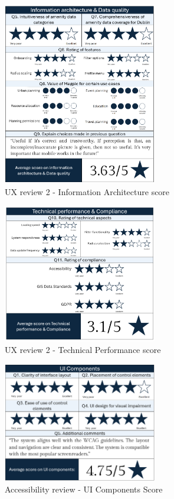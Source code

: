 \begin{figure}[h!]
    \centering
    \includegraphics[width=0.6\textwidth]{images/ux-survey2-data.png}
    \caption{UX review 2 - Information Architecture score}
    \label{fig:ux2datascore}
\end{figure}

\begin{figure}[h!]
    \centering
    \includegraphics[width=0.6\textwidth]{images/ux-survey2-technical.png}
    \caption{UX review 2 - Technical Performance score}
    \label{fig:ux2technicalscore}
\end{figure}

\begin{figure}[h!]
    \centering
    \includegraphics[width=0.6\textwidth]{images/accessb-survey-components.png}
    \caption{Accessibility review - UI Components Score}
    \label{fig:accessbuiscore}
\end{figure}


